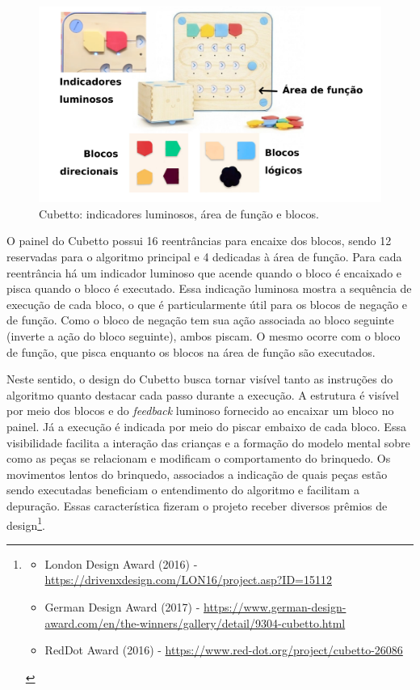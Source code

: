 \begin{figure}
    \centering
    \includegraphics[width=.7\linewidth,fbox]{figs/cubetto_blocks.png}
    \caption{Cubetto: indicadores luminosos, área de função e blocos.}
    \label{fig:cubetto_features}
\end{figure}

O painel do Cubetto possui 16 reentrâncias para encaixe dos blocos, sendo 12 reservadas para o algoritmo principal e 4 dedicadas à área de função. Para cada reentrância há um indicador luminoso que acende quando o bloco é encaixado e pisca quando o bloco é executado. Essa indicação luminosa mostra a sequência de execução de cada bloco, o que é particularmente útil para os blocos de negação e de função. Como o bloco de negação tem sua ação associada ao bloco seguinte (inverte a ação do bloco seguinte), ambos piscam. O mesmo ocorre com o bloco de função, que pisca enquanto os blocos na área de função são executados.

Neste sentido, o design do Cubetto busca tornar visível tanto as instruções do algoritmo quanto destacar cada passo durante a execução. A estrutura é visível por meio dos blocos e do \textit{feedback} luminoso fornecido ao encaixar um bloco no painel. Já a execução é indicada por meio do piscar embaixo de cada bloco. Essa visibilidade facilita a interação das crianças e a formação do modelo mental sobre como as peças se relacionam e modificam o comportamento do brinquedo. Os movimentos lentos do brinquedo, associados a indicação de quais peças estão sendo executadas beneficiam o entendimento do algoritmo e facilitam a depuração. Essas característica fizeram o projeto receber diversos prêmios de design\footnote{
\begin{itemize}
    \item London Design Award (2016) - \url{https://drivenxdesign.com/LON16/project.asp?ID=15112}
    \item German Design Award (2017) - \url{https://www.german-design-award.com/en/the-winners/gallery/detail/9304-cubetto.html}
    \item RedDot Award (2016) - \url{https://www.red-dot.org/project/cubetto-26086}
\end{itemize}
}.

